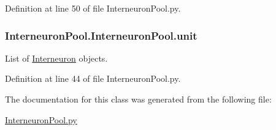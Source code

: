 Definition at line 50 of file Interneuron\+Pool.\+py.

\subsubsection[{\texorpdfstring{unit}{unit}}]{\setlength{\rightskip}{0pt plus 5cm}Interneuron\+Pool.\+Interneuron\+Pool.\+unit}\hypertarget{class_interneuron_pool_1_1_interneuron_pool_ac685ab8eaf9a18627c61431b987874e6}{}\label{class_interneuron_pool_1_1_interneuron_pool_ac685ab8eaf9a18627c61431b987874e6}


List of \hyperlink{namespace_interneuron}{Interneuron} objects. 



Definition at line 44 of file Interneuron\+Pool.\+py.



The documentation for this class was generated from the following file\+:\begin{DoxyCompactItemize}
\item 
\hyperlink{_interneuron_pool_8py}{Interneuron\+Pool.\+py}\end{DoxyCompactItemize}

